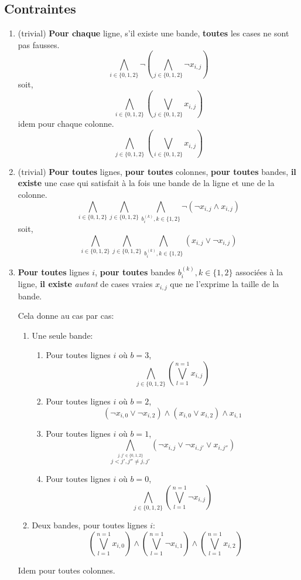 \documentclass[a4paper,12pt]{report}
\begin{document}
\subsection{Contraintes}
\begin{enumerate}

\item (trivial) \textbf{Pour chaque} ligne, s'il existe une bande, \textbf{toutes} les cases ne sont pas fausses.
$$ \bigwedge_{i \in \{0,1,2\}} \lnot \left( \bigwedge_{j \in \{0,1,2\}} \lnot x_{i,j} \right) $$
soit,
$$ \bigwedge_{i \in \{0,1,2\}} \left( \bigvee_{j \in \{0,1,2\}} x_{i,j} \right) $$
idem pour chaque colonne.
$$ \bigwedge_{j \in \{0,1,2\}} \left( \bigvee_{i \in \{0,1,2\}} x_{i,j} \right) $$

\item (trivial) \textbf{Pour toutes} lignes, \textbf{pour toutes} colonnes, \textbf{pour toutes} bandes, \textbf{il existe} une case qui satisfait à la fois une bande de la ligne et une de la colonne.
$$\bigwedge_{i \in \{0,1,2\}} \bigwedge_{j \in \{0,1,2\}} \bigwedge_{b_i^{(k)}, k\in\{1,2\}} 
\lnot \left(
	\lnot x_{i,j} \wedge x_{i,j}
\right)$$
soit,
$$\bigwedge_{i \in \{0,1,2\}} \bigwedge_{j \in \{0,1,2\}} \bigwedge_{b_i^{(k)}, k\in\{1,2\}} 
\left(
	x_{i,j} \vee \lnot x_{i,j}
\right)$$

\item \textbf{Pour toutes} lignes $i$, \textbf{pour toutes} bandes $b_i^{(k)}, k\in\{1,2\}$ associées à la ligne, \textbf{il existe} \textit{autant} de cases vraies $x_{i,j}$ que ne l'exprime la taille de la bande. 

Cela donne au cas par cas:
	\begin{enumerate}
		\item Une seule bande: 
		\begin{enumerate}
			\item Pour toutes lignes $i$ où $b=3$, 
			$$\bigwedge_{j\in\{0,1,2\}}\left( \bigvee_{l=1}^{n=1} x_{i,j} \right)$$
			\item Pour toutes lignes $i$ où $b=2$, 
			$$(\lnot x_{i,0} \vee \lnot x_{i,2}) \wedge (x_{i,0} \vee x_{i,2}) \wedge x_{i,1}$$
			\item Pour toutes lignes $i$ où $b=1$, 
			$$\bigwedge_{\stackrel{j,j' \in\{0,1,2\}}{j<j', j''\neq j,j'}} (\lnot x_{i,j}\vee \lnot x_{i,j'} \vee x_{i,j''} ) $$
			\item Pour toutes lignes $i$ où $b=0$,
			$$\bigwedge_{j\in\{0,1,2\}}\left( \bigvee_{l=1}^{n=1} \lnot x_{i,j} \right)$$
		\end{enumerate}
		\item Deux bandes, pour toutes lignes $i$:
		$$\left( \bigvee_{l=1}^{n=1} x_{i,0} \right) \wedge \left(\bigvee_{l=1}^{n=1} \lnot x_{i,1}\right) \wedge \left(\bigvee_{l=1}^{n=1} x_{i,2}\right)$$
	\end{enumerate}
	Idem pour toutes colonnes. 
\end{enumerate}
\end{document}
